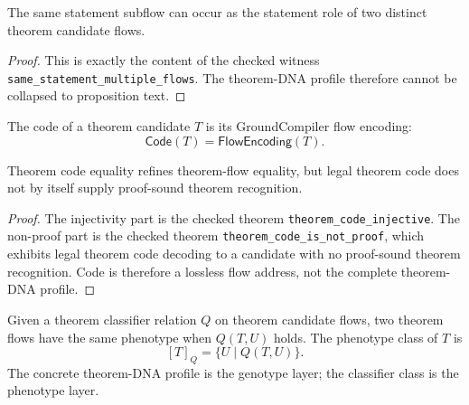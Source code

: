 \begin{theorem}
\label{thm:shared-statement-does-not-determine-theorem-flow}
The same statement subflow can occur as the statement role of two distinct
theorem candidate flows.
\end{theorem}
\begin{proof}
This is exactly the content of the checked witness
\texttt{same\_statement\_multiple\_flows}. The theorem-DNA profile therefore
cannot be collapsed to proposition text.
\end{proof}

\begin{definition}
\label{def:theorem-dna-code}
The code of a theorem candidate $T$ is its GroundCompiler flow encoding:
$$
\mathsf{Code}(T)=\mathsf{FlowEncoding}(T).
$$
\end{definition}

\begin{theorem}
\label{thm:theorem-code-injective-not-proof}
Theorem code equality refines theorem-flow equality, but legal theorem code
does not by itself supply proof-sound theorem recognition.
\end{theorem}
\begin{proof}
The injectivity part is the checked theorem \texttt{theorem\_code\_injective}.
The non-proof part is the checked theorem \texttt{theorem\_code\_is\_not\_proof},
which exhibits legal theorem code decoding to a candidate with no proof-sound
theorem recognition. Code is therefore a lossless flow address, not the
complete theorem-DNA profile.
\end{proof}

\begin{definition}
\label{def:theorem-dna-phenotype}
Given a theorem classifier relation $Q$ on theorem candidate flows, two
theorem flows have the same phenotype when $Q(T,U)$ holds. The phenotype class
of $T$ is
$$
[T]_Q=\{U\mid Q(T,U)\}.
$$
The concrete theorem-DNA profile is the genotype layer; the classifier class is
the phenotype layer.
\end{definition}


